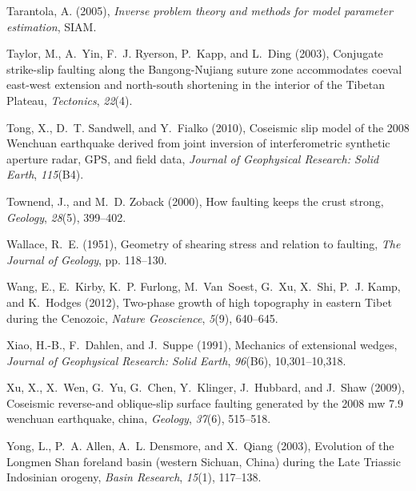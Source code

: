 \documentclass[twocolumn,jgrga]{AGUTeX}
\begin{document}
\begin{article}
{{\begin{thebibliography}{85}
Tarantola, A. (2005), \textit{Inverse problem theory and methods for model
  parameter estimation}, SIAM.

Taylor, M., A.~Yin, F.~J. Ryerson, P.~Kapp, and L.~Ding (2003), Conjugate
  strike-slip faulting along the {B}angong-{N}ujiang suture zone accommodates
  coeval east-west extension and north-south shortening in the interior of the
  {T}ibetan {P}lateau, \textit{Tectonics}, \textit{22}(4).

Tong, X., D.~T. Sandwell, and Y.~Fialko (2010), Coseismic slip model of the
  2008 {W}enchuan earthquake derived from joint inversion of interferometric
  synthetic aperture radar, {G}{P}{S}, and field data, \textit{Journal of
  Geophysical Research: Solid Earth}, \textit{115}(B4).

Townend, J., and M.~D. Zoback (2000), How faulting keeps the crust strong,
  \textit{Geology}, \textit{28}(5), 399--402.

Wallace, R.~E. (1951), Geometry of shearing stress and relation to faulting,
  \textit{The Journal of Geology}, pp. 118--130.

Wang, E., E.~Kirby, K.~P. Furlong, M.~Van~Soest, G.~Xu, X.~Shi, P.~J. Kamp, and
  K.~Hodges (2012), Two-phase growth of high topography in eastern {T}ibet
  during the {C}enozoic, \textit{Nature Geoscience}, \textit{5}(9), 640--645.

Xiao, H.-B., F.~Dahlen, and J.~Suppe (1991), Mechanics of extensional wedges,
  \textit{Journal of Geophysical Research: Solid Earth}, \textit{96}(B6),
  10,301--10,318.

Xu, X., X.~Wen, G.~Yu, G.~Chen, Y.~Klinger, J.~Hubbard, and J.~Shaw (2009),
  Coseismic reverse-and oblique-slip surface faulting generated by the 2008 mw
  7.9 wenchuan earthquake, china, \textit{Geology}, \textit{37}(6), 515--518.

Yong, L., P.~A. Allen, A.~L. Densmore, and X.~Qiang (2003), Evolution of the
  {L}ongmen {S}han foreland basin (western {S}ichuan, {C}hina) during the
  {L}ate {T}riassic {I}ndosinian orogeny, \textit{Basin Research},
  \textit{15}(1), 117--138.


\end{thebibliography}}}
\end{article}
\end{document}
